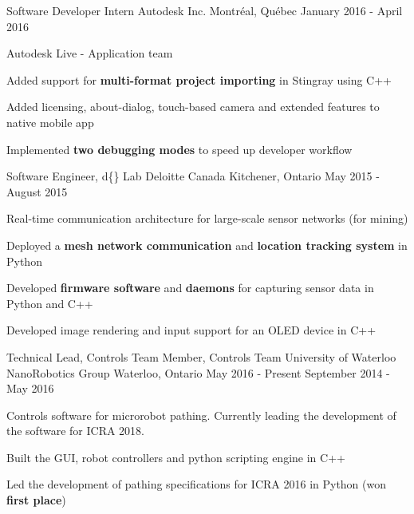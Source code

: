 \begin{cventries}

\cventry
{Software Developer Intern}
{Autodesk Inc.}
{Montréal, Québec}
{January 2016 - April 2016}
{ %
Autodesk Live - Application team
\begin{cvitems}
\item[]
\item {Added support for \textbf{multi-format project importing} in Stingray using C++}
\item {Added licensing, about-dialog, touch-based camera and extended features to native mobile app}
\item {Implemented \textbf{two debugging modes} to speed up developer workflow}
\end{cvitems}
}


\cventry
{Software Engineer, d\{\} Lab}
{Deloitte Canada} %
{Kitchener, Ontario} %
{May 2015 - August 2015} %
{
Real-time communication architecture for large-scale sensor networks (for mining)
\begin{cvitems}
\item[]
\item {Deployed a \textbf{mesh network communication} and \textbf{location tracking system} in Python}
\item {Developed \textbf{firmware software} and \textbf{daemons} for capturing sensor data in Python and C++}
\item {Developed image rendering and input support for an OLED device in C++}
\end{cvitems}
}


\cventry
{Technical Lead, Controls Team \newline {\vspace{-.75mm}}
Member, Controls Team}
{University of Waterloo NanoRobotics Group}
{Waterloo, Ontario}
{May 2016 - Present \newline {\vspace{-1mm}}
September 2014 - May 2016} %
{ %
Controls software for microrobot pathing. Currently leading the development of the software for ICRA 2018.
\begin{cvitems}
\item[]
\item {Built the GUI, robot controllers and python scripting engine in C++}
\item {Led the development of pathing specifications for ICRA 2016 in Python (won \textbf{first place})}
\end{cvitems}
}

\end{cventries}
